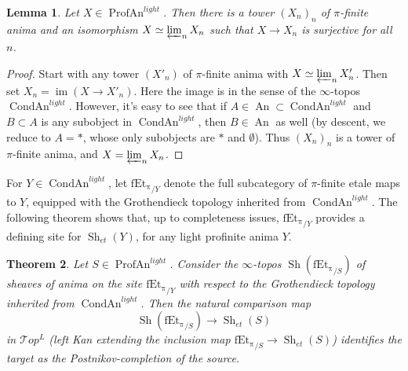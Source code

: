\documentclass[12pt]{article}
\newtheorem{theorem}{Theorem}[section]
\newtheorem{lemma}[theorem]{Lemma}
\newcommand{\on}{\operatorname}
\begin{document}
\begin{lemma}\label{surjtower}
Let $X\in\on{ProfAn}^{light}$.  Then there is a tower $(X_n)_n$ of $\pi$-finite anima and an isomorphism $X\simeq \varprojlim_n X_n$ such that $X\rightarrow X_n$ is surjective for all $n$.
\end{lemma}
\begin{proof}
Start with any tower $(X'_n)$ of $\pi$-finite anima with $X\simeq\varprojlim_n X'_n$.  Then set $X_n = \on{im}(X\rightarrow X'_n)$.  Here the image is in the sense of the $\infty$-topos $\on{CondAn}^{light}$.  However, it's easy to see that if $A\in\on{An}\subset\on{CondAn}^{light}$ and $B\subset A$ is any subobject in $\on{CondAn}^{light}$, then $B\in\on{An}$ as well (by descent, we reduce to $A=\ast$, whose only subobjects are $\ast$ and $\emptyset$).  Thus $(X_n)_n$ is a tower of $\pi$-finite anima, and $X=\varprojlim_n X_n$.
\end{proof}

For $Y\in\on{CondAn}^{light}$, let $\on{fEt_\pi}_{/Y}$ denote the full subcategory of $\pi$-finite etale maps to $Y$, equipped with the Grothendieck topology inherited from $\on{CondAn}^{light}$.  The following theorem shows that, up to completeness issues, $\on{fEt_\pi}_{/Y}$ provides a defining site for $\on{Sh}_{et}(Y)$, for any light profinite anima $Y$.

\begin{theorem}\label{truncatedtheorem}
Let $S\in\on{ProfAn}^{light}$.  Consider the $\infty$-topos $\on{Sh}(\on{fEt_\pi}_{/S})$ of sheaves of anima on the site $\on{fEt_\pi}_{/Y}$ with respect to the Grothendieck topology inherited from $\on{CondAn}^{light}$.  Then the natural comparison map
$$\on{Sh}(\on{fEt_\pi}_{/S})\rightarrow \on{Sh}_{et}(S)$$
in $\mathcal{T}op^L$ (left Kan extending the inclusion map $\on{fEt_\pi}_{/S}\rightarrow \on{Sh}_{et}(S)$) identifies the target as the Postnikov-completion of the source.
\end{theorem}
\end{document}

